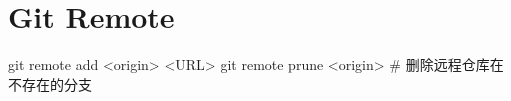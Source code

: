 \section{Git Remote}
\begin{shellcmd}
git remote add <origin> <URL>
git remote prune <origin> # 删除远程仓库在不存在的分支
\end{shellcmd}
